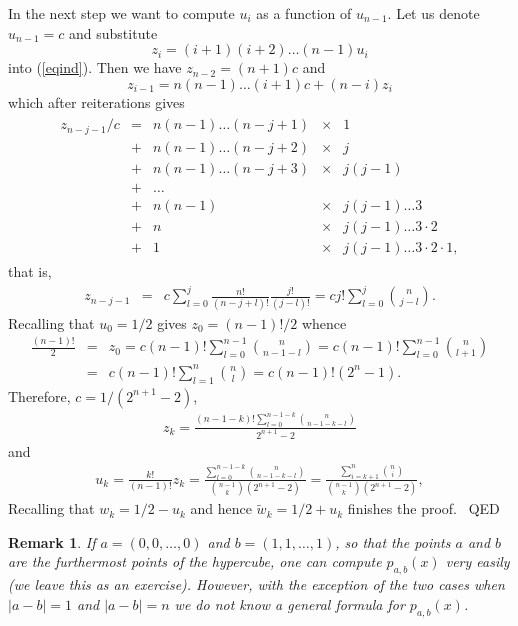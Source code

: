 \documentclass[12pt]{article}
\newtheorem{remark}{Remark}
\newenvironment{proof}{{\sc Proof:}}{~\hfill QED}
\begin{document}
\begin{proof}
In the next step we want to compute $u_i$ as a function of
$u_{n-1}$. Let us denote $u_{n-1}=c$ and substitute
$$
z_i=(i+1)(i+2)\dots (n-1) u_i
$$
into (\ref{eqind}). Then we have $z_{n-2}=(n+1) c$ and
$$
z_{i-1}=n(n-1)\dots(i+1)c+(n-i) z_i
$$
which after reiterations gives
 \begin{eqnarray*}
  \begin{array}{rclcl}
  z_{n-j-1}/c&=&n(n-1)\dots(n-j+1)&\times& 1
  \\&+& n(n-1)\dots(n-j+2)&\times &j \\
 &+& n(n-1)\dots(n-j+3)&\times&  j(j-1)\\
  &+&\dots\\
 &+&n(n-1)&\times& j(j-1)\dots 3 \\
 &+&n&\times& j(j-1)\dots 3\cdot 2 \\
 &+&1&\times& j(j-1)\dots 3\cdot 2\cdot 1,
 \end{array}
\end{eqnarray*}
that is,
\begin{eqnarray*}
  z_{n-j-1}&=&c\sum_{l=0}^{j} \frac{n!}{(n-j+l)!}\frac{j!}{(j-l)!}
   =cj!\sum_{l=0}^{j} {n \choose j-l}.
\end{eqnarray*}
Recalling that $u_0=1/2$ gives $z_0=(n-1)!/2$ whence
\begin{eqnarray*}
  \frac{(n-1)!}{2}&=&z_{0}
  =c(n-1)!\sum_{l=0}^{n-1} {n \choose n-1-l}
  =c(n-1)!\sum_{l=0}^{n-1} {n \choose l+1}\\
  &=&c(n-1)!\sum_{l=1}^{n} {n \choose l}
  =c(n-1)!\left(2^n-1\right).
\end{eqnarray*}
Therefore, $c=1/(2^{n+1}-2)$,
\begin{eqnarray*}
z_k=\frac{(n-1-k)!\sum_{l=0}^{n-1-k} {n \choose
n-1-k-l}}{2^{n+1}-2}
\end{eqnarray*}
and
\begin{eqnarray*}
u_k= \frac{k!}{(n-1)!}z_k
 =\frac{\sum_{l=0}^{n-1-k}{n \choose n-1-k-l}}{{n-1\choose k}\left(2^{n+1}-2\right)}
 =\frac{\sum_{i=k+1}^{n} {n \choose i}}{{n-1\choose
 k}\left(2^{n+1}-2\right)},
\end{eqnarray*}
Recalling that $w_k=1/2-u_k$ and hence $\tilde w_k=1/2+u_k$
finishes the proof.
\end{proof}
\begin{remark}
If $a=(0,0,\dots,0)$ and $b=(1,1,\dots,1)$, so that the points $a$
and $b$ are the furthermost points of the hypercube, one can
compute $p_{a,b}(x)$ very easily (we leave this as an exercise).
However,  with the exception of the two cases when $|a-b|=1$ and
$|a-b|=n$ we do not know a general formula for $p_{a,b}(x)$.
\end{remark}
\end{document}
